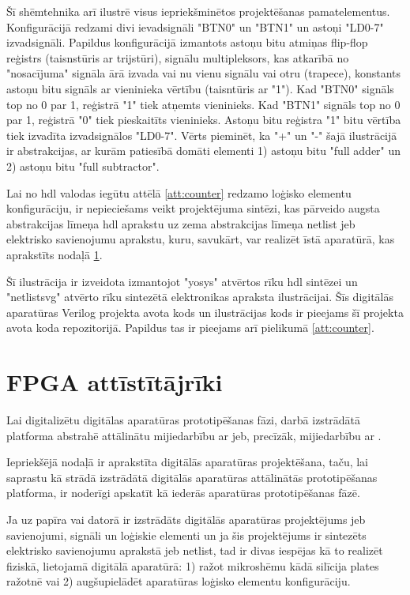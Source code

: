 Šī shēmtehnika arī ilustrē visus iepriekšminētos projektēšanas pamatelementus.
Konfigurācijā redzami divi ievadsignāli "BTN0" un "BTN1" un astoņi "LD{0-7}"
izvadsignāli. Papildus konfigurācijā izmantots astoņu bitu atmiņas flip-flop
reģistrs (taisnstūris ar trijstūri), signālu multipleksors, kas atkarībā no
"nosacījuma" signāla ārā izvada vai nu vienu signālu vai otru (trapece),
konstants astoņu bitu signāls ar vieninieka vērtību (taisntūris ar "1"). Kad
"BTN0" signāls top no 0 par 1, reģistrā "1" tiek atņemts vieninieks. Kad "BTN1"
signāls top no 0 par 1, reģistrā "0" tiek pieskaitīts vieninieks. Astoņu bitu
reģistra "1" bitu vērtība tiek izvadīta izvadsignālos "LD{0-7}". Vērts pieminēt,
ka "+" un "-" šajā ilustrācijā ir abstrakcijas, ar kurām patiesībā domāti
elementi 1) astoņu bitu "full adder" un 2) astoņu bitu "full subtractor".

Lai no \gls{hdl} valodas iegūtu attēlā \ref{att:counter} redzamo loģisko
elementu konfigurāciju, ir nepieciešams veikt projektējuma sintēzi, kas pārveido
augsta abstrakcijas līmeņa \gls{hdl} aprakstu uz zema abstrakcijas līmeņa
\gls{netlist} jeb elektrisko savienojumu aprakstu, kuru, savukārt, var realizēt
īstā aparatūrā, kas aprakstīts nodaļā \ref{sec:fpgaboard}.

Šī ilustrācija ir izveidota izmantojot "yosys" atvērtos rīku \gls{hdl} sintēzei
un "netlistsvg" atvērto rīku sintezētā elektronikas apraksta ilustrācijai. Šīs
digitālās aparatūras Verilog projekta avota kods un ilustrācijas kods ir
pieejams šī projekta avota koda repozitorijā. \cite{VeinbahsKrisjanisTestbed}
Papildus tas ir pieejams arī pielikumā \ref{att:counter}.

\section{FPGA attīstītājrīki}
\label{sec:fpgaboard}

Lai digitalizētu digitālas aparatūras prototipēšanas fāzi, darbā izstrādātā
platforma abstrahē attālinātu mijiedarbību ar  jeb, precīzāk, mijiedarbību ar .

Iepriekšējā nodaļā ir aprakstīta digitālās aparatūras projektēšana, taču, lai
saprastu kā strādā izstrādātā digitālās aparatūras attālinātās prototipēšanas
platforma, ir noderīgi apskatīt kā  iederās aparatūras prototipēšanas fāzē.

Ja uz papīra vai datorā ir izstrādāts digitālās aparatūras projektējums jeb
savienojumi, signāli un loģiskie elementi un ja šis projektējums ir sintezēts
elektrisko savienojumu aprakstā jeb \gls{netlist}, tad ir divas iespējas kā to
realizēt fiziskā, lietojamā digitālā aparatūrā: 1) ražot mikroshēmu kādā
silīcija plates ražotnē \cite{WikiFabs} vai 2)  augšupielādēt aparatūras loģisko elementu
konfigurāciju.

